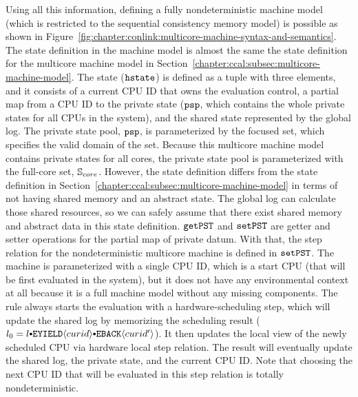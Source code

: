 Using all this information, defining a fully nondeterministic machine model (which is restricted to the sequential consistency memory model) 
is possible as shown  in Figure~\ref{fig:chapter:conlink:multicore-machine-syntax-and-semantics}.
The state definition in the machine model is almost the same  the state definition for the multicore machine model in Section~\ref{chapter:ccal:subsec:multicore-machine-model}. 
The state (${{\mathrm{\texttt{hstate}}}}$) is defined as a tuple with three elements, and it consists of a current CPU ID that owns the evaluation control,
a partial map from a CPU ID to the private state (${{\mathrm{\texttt{psp}}}}$, which contains the whole private states for all CPUs in the system),
and the shared state represented by the global log. 
The private state pool, ${{\mathrm{\texttt{psp}}}}$, is parameterized by 
the focused set, which specifies the valid domain of the set. 
Because this multicore machine model contains private states for all cores,
the private state pool is parameterized with the full-core set, ${\mathbb{S}_{core}}$.
However, the state definition differs from the state definition in Section~\ref{chapter:ccal:subsec:multicore-machine-model} 
in terms of not having shared memory and an abstract state. 
The global log can calculate those shared resources, so we can safely assume that there exist shared memory and abstract data in this state definition. 
${{\mathrm{\texttt{getPST}}}}$ and ${{\mathrm{\texttt{setPST}}}}$ are getter and setter operations for the partial map of private datum. 
With that, 
the step relation for the nondeterministic multicore machine is defined in ${{\mathrm{\texttt{setPST}}}}$. 
The machine is parameterized with a single CPU ID, which is a start CPU (that will be first evaluated in the system),
but it does not have any environmental context at all because it is a full machine model without any missing components. 
The rule always starts the evaluation 
with a hardware-scheduling step, which will update the shared log by memorizing 
the scheduling result ($l_0 = \listconsoppo{\yieldbackev{curid'}}{\listconsoppo{\yieldev{curid}}{l}}$). 
It then  updates the local view of the newly scheduled CPU via hardware local step relation. 
The result will eventually update the shared log, the private state, and the current CPU ID. 
Note that choosing the next CPU ID that will be evaluated in this step relation is totally nondeterministic.